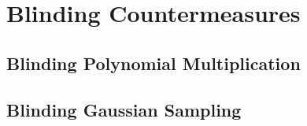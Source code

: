 %
%

\chapter{Blinding Countermeasures}

\section{Blinding Polynomial Multiplication}

\section{Blinding Gaussian Sampling}